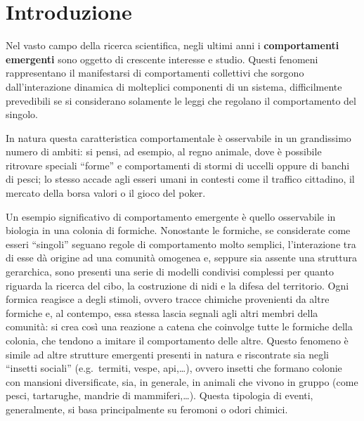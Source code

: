 \chapter{Introduzione}\label{chap:introduzione}

Nel vasto campo della ricerca scientifica, negli ultimi anni i \textbf{comportamenti emergenti} sono oggetto di 
crescente interesse e studio. Questi fenomeni rappresentano il manifestarsi di comportamenti collettivi che sorgono
dall'interazione dinamica di molteplici componenti di un sistema, difficilmente prevedibili se si considerano solamente 
le leggi che regolano il comportamento del singolo. 

In natura questa caratteristica comportamentale è osservabile in un grandissimo numero di ambiti: si pensi, ad esempio, al regno 
animale, dove è possibile ritrovare speciali ``forme'' e comportamenti di stormi di uccelli oppure di banchi di pesci; lo stesso accade 
agli esseri umani in contesti come il traffico cittadino, il mercato della borsa valori o il gioco del poker.

Un esempio significativo di comportamento emergente è quello osservabile in biologia in una colonia di formiche. Nonostante le formiche, se considerate 
come esseri ``singoli'' seguano regole di comportamento molto semplici,
l'interazione tra di esse dà origine ad una comunità omogenea e, seppure sia assente una struttura gerarchica, sono presenti una serie di modelli condivisi
complessi per quanto riguarda la ricerca del cibo, la costruzione di nidi e la difesa del territorio.
Ogni formica reagisce a degli stimoli, ovvero tracce chimiche provenienti da altre formiche e, al contempo, essa stessa lascia segnali agli altri membri
della comunità: si crea così una reazione a catena che coinvolge tutte le formiche della colonia, che tendono a imitare il comportamento delle altre.
Questo fenomeno è simile ad altre strutture emergenti presenti in natura e riscontrate sia negli ``insetti sociali'' (e.g.\ termiti, vespe, api,\dots),
ovvero insetti che formano colonie con mansioni diversificate, sia, in generale, in animali che vivono in gruppo 
(come pesci, tartarughe, mandrie di mammiferi,\ldots). Questa tipologia di eventi, generalmente, si basa principalmente su feromoni o odori chimici.

